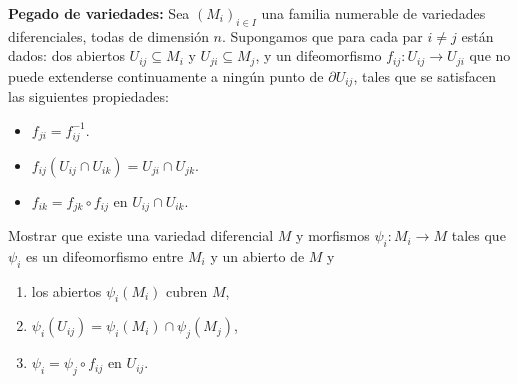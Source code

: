 \documentclass[12pt, a4paper]{amsart}
\theoremstyle{definition}
\begin{document}
\begin{question}
\textbf{Pegado de variedades:} Sea $(M_i)_{i\in I}$ una familia numerable de variedades diferenciales, todas de dimensión $n$. Supongamos que para cada par $i\neq j$ están dados: dos abiertos $U_{ij}\subseteq M_i$ y $U_{ji}\subseteq M_j$, y un difeomorfismo $f_{ij}:U_{ij}\to U_{ji}$ que no puede extenderse continuamente a ningún punto de $\partial U_{ij}$, tales que se satisfacen las siguientes propiedades:
\begin{itemize}
\item $f_{ji}=f_{ij}^{-1}$.
\item $f_{ij}(U_{ij}\cap U_{ik}) = U_{ji}\cap U_{jk}$.
\item $f_{ik} = f_{jk}\circ f_{ij}$ en $U_{ij}\cap U_{ik}$.
\end{itemize}

Mostrar que existe una variedad diferencial $M$ y morfismos $\psi_i:M_i\to M$ tales que $\psi_i$ es un difeomorfismo entre $M_i$ y un abierto de $M$ y
\begin{enumerate}[label=\textbf{\alph*.}]
\item los abiertos $\psi_i(M_i)$ cubren $M$,
\item $\psi_i(U_{ij})=\psi_i(M_i)\cap\psi_j(M_j)$,
\item $\psi_i=\psi_j\circ f_{ij}$ en $U_{ij}$.
\end{enumerate}
\end{question}
\end{document}
